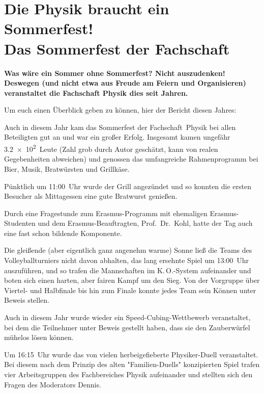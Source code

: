 
\section[Die Physik braucht ein Sommerfest! Das Sommerfest der Fachschaft]{Die Physik braucht ein Sommerfest!\\Das Sommerfest der Fachschaft}
\begin{multicols*}{2}
\setlength{\parskip}{1.6\parskip}

\textbf{Was wäre ein Sommer ohne Sommerfest? Nicht auszudenken! Deswegen (und nicht etwa aus Freude am Feiern und Organisieren) veranstaltet die Fachschaft Physik dies seit Jahren.}


Um euch einen Überblick geben zu können, hier der Bericht diesen Jahres:

Auch in diesem Jahr kam das Sommerfest der Fachschaft~Physik bei allen Beteiligten gut an und war ein großer Erfolg. Insgesamt kamen ungefähr \num{3,2e2}~Leute (Zahl grob durch Autor geschätzt, kann von realen Gegebenheiten abweichen) und genossen das umfangreiche Rahmenprogramm bei Bier, Musik, Bratwürsten und Grillkäse.

Pünktlich um 11:00~Uhr wurde der Grill angezündet und so konnten die ersten Besucher als Mittagessen eine gute Bratwurst genießen.

Durch eine Fragestunde zum Erasmus-Programm mit ehemaligen Erasmus-Studenten und dem Erasmus-Beauftragten, Prof.\ Dr.\ Kohl, hatte der Tag auch eine fast schon bildende Komponente.

Die gleißende (aber eigentlich ganz angenehm warme) Sonne ließ die Teams des Volleyballturniers nicht davon abhalten, das lang ersehnte Spiel um 13:00~Uhr auszuführen, und so trafen die Mannschaften im K.\,O.-System aufeinander und boten sich einen harten, aber fairen Kampf um den Sieg. Von der Vorgruppe über Viertel- und Halbfinale bis hin zum Finale konnte jedes Team sein Können unter Beweis stellen.

Auch in diesem Jahr wurde wieder ein Speed-Cubing-Wettbewerb veranstaltet, bei dem die Teilnehmer unter Beweis gestellt haben, dass sie den Zauberwürfel mühelos lösen können.

Um 16:15~Uhr wurde das von vielen herbeigefieberte Physiker-Duell veranstaltet. Bei diesem nach dem Prinzip des alten "Familien-Duells" konzipierten Spiel trafen vier Arbeitsgruppen des Fachbereiches Physik aufeinander und stellten sich den Fragen des Moderators Dennis.


\end{multicols*}
